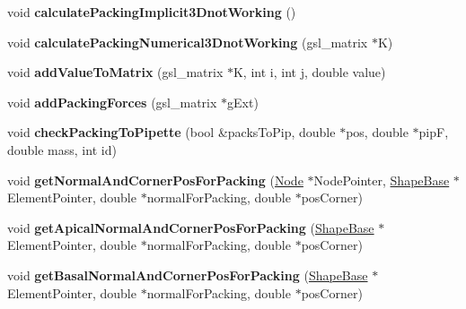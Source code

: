 \begin{DoxyCompactItemize}
\item 
\hypertarget{classSimulation_a7ce68d426ad89240aaf9dfdf80883d46}{}void {\bfseries calculate\+Packing\+Implicit3\+Dnot\+Working} ()\label{classSimulation_a7ce68d426ad89240aaf9dfdf80883d46}

\item 
\hypertarget{classSimulation_adb354f77a0abac522dcc87443ca9304a}{}void {\bfseries calculate\+Packing\+Numerical3\+Dnot\+Working} (gsl\+\_\+matrix $\ast$K)\label{classSimulation_adb354f77a0abac522dcc87443ca9304a}

\item 
\hypertarget{classSimulation_ac096cfe7f8b3b7b66f6af2a87ff6556f}{}void {\bfseries add\+Value\+To\+Matrix} (gsl\+\_\+matrix $\ast$K, int i, int j, double value)\label{classSimulation_ac096cfe7f8b3b7b66f6af2a87ff6556f}

\item 
\hypertarget{classSimulation_a7a62be5131e130aa7f631201d5a4a49a}{}void {\bfseries add\+Packing\+Forces} (gsl\+\_\+matrix $\ast$g\+Ext)\label{classSimulation_a7a62be5131e130aa7f631201d5a4a49a}

\item 
\hypertarget{classSimulation_a4789349db2f4a908064f05e0ee74265d}{}void {\bfseries check\+Packing\+To\+Pipette} (bool \&packs\+To\+Pip, double $\ast$pos, double $\ast$pip\+F, double mass, int id)\label{classSimulation_a4789349db2f4a908064f05e0ee74265d}

\item 
\hypertarget{classSimulation_a004805b638cbb25dee920e8883dca667}{}void {\bfseries get\+Normal\+And\+Corner\+Pos\+For\+Packing} (\hyperlink{classNode}{Node} $\ast$Node\+Pointer, \hyperlink{classShapeBase}{Shape\+Base} $\ast$Element\+Pointer, double $\ast$normal\+For\+Packing, double $\ast$pos\+Corner)\label{classSimulation_a004805b638cbb25dee920e8883dca667}

\item 
\hypertarget{classSimulation_a532ee0b0d6b016b898391fc7188187cc}{}void {\bfseries get\+Apical\+Normal\+And\+Corner\+Pos\+For\+Packing} (\hyperlink{classShapeBase}{Shape\+Base} $\ast$Element\+Pointer, double $\ast$normal\+For\+Packing, double $\ast$pos\+Corner)\label{classSimulation_a532ee0b0d6b016b898391fc7188187cc}

\item 
\hypertarget{classSimulation_a80ed7a37c28be0fd5bdbd097e4b44344}{}void {\bfseries get\+Basal\+Normal\+And\+Corner\+Pos\+For\+Packing} (\hyperlink{classShapeBase}{Shape\+Base} $\ast$Element\+Pointer, double $\ast$normal\+For\+Packing, double $\ast$pos\+Corner)\label{classSimulation_a80ed7a37c28be0fd5bdbd097e4b44344}


\end{DoxyCompactItemize}
